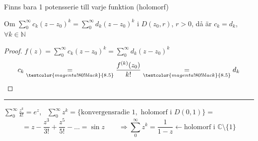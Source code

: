 \begin{theorem}[Kor 8.6]
\hfill \textcolor{magenta!80!black}{Finns bara 1 potensserie till varje funktion (holomorf)}

Om $\sum_0^\infty c_k(z - z_0)^k = \sum_0^\infty d_k(z - z_0)^k$ i $D(z_0, r)$, $r > 0$, då är $c_k = d_k$, $\forall k \in \mathbb{N}$
\end{theorem}
\begin{proof}
$f(z) = \sum_0^\infty c_k(z - z_0)^k = \sum_0^\infty d_k(z - z_0)^k$
\[ c_k \underset{\textcolor{magenta!80!black}{8.5}}{=} \frac{f^{(k)}(z_0)}{k!} \underset{\textcolor{magenta!80!black}{8.5}}{=} d_k \]
\end{proof}

\noindent\rule{\linewidth}{0.4pt}

\begin{example}
$\displaystyle\sum_0^\infty \frac{z^k}{k!} = e^z$, \ $\displaystyle\sum_0^\infty z^k = \{\text{konvergensradie } 1, \text{ holomorf i } D(0, 1)\} =$
\[ = z - \frac{z^3}{3!} + \frac{z^5}{5!} - \dots = \sin z \qquad \Rightarrow \sum_0^\infty z^k = \frac{1}{1 - z} \longleftarrow \text{holomorf i } \mathbb{C} \setminus \{1\} \]
\end{example}
